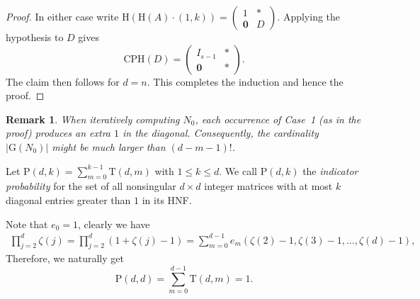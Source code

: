 \documentclass[reqno, 12pt]{article}
\theoremstyle{mydefinition}
\theoremstyle{myremark}
\newtheorem{rem}[thm]{Remark}
\numberwithin{algorithm}{section}
\newcommand{\h}{{\mathrm{H}}}
\begin{document}
\begin{proof}
In either case write $\h(\h(A)\cdot (1,k)) = \begin{pmatrix} 1 & * \\ \mathbf{0} & D \end{pmatrix}$. Applying the  hypothesis to $D$ gives
\[
\mathrm{CPH}(D)=\begin{pmatrix}
         I_{s-1} & * \\
         \mathbf{0} & *
       \end{pmatrix}.
\]
The claim then follows for $d=n$. This completes the induction and hence the proof.
\end{proof}

\begin{rem}
When iteratively computing $N_0$, each occurrence of Case~1 (as in the proof) produces an extra $1$ in the diagonal. Consequently, the cardinality $|\mathrm{G}(N_0)|$ might be much larger than $(d - m - 1)!$.
\end{rem}

Let $\mathrm P(d,k) = \sum_{m=0}^{k-1} \mathrm{T}(d,m)$ with $1\leq k\leq d$.
We call $\mathrm P(d,k)$ the \emph{indicator probability} for the set of all nonsingular $d \times d$ integer matrices with at most $k$ diagonal entries greater than $1$ in its HNF.

Note that  $e_0=1$, clearly we have
\begin{align*}
\prod_{j=2}^d \zeta(j)=\prod_{j=2}^d (1+\zeta(j)-1)=\sum_{m=0}^{d-1} e_m(\zeta(2)-1,\zeta(3)-1,\ldots,\zeta(d)-1),
\end{align*}
Therefore, we naturally get
$$\mathrm P(d,d) = \sum_{m=0}^{d-1} \mathrm{T}(d,m)=1.$$
\end{document}
